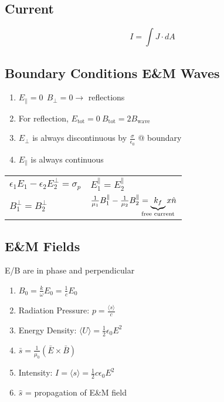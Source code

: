 \documentclass[10pt,letter]{article}
\begin{document}
\subsection{Current}
\begin{equation}
 I = \int J \cdot dA 
\end{equation}

\subsection{Boundary Conditions E\&M Waves}
\begin{enumerate}
    \item $E_\parallel = 0~~B_\perp = 0 \rightarrow$ reflections
    \item For reflection, $E_{\textrm{tot}} = 0~B_{\textrm{tot}} = 2B_{\textrm{wave}}$
    \item $E_\perp$ is always discontinuous by $\frac{\sigma}{\epsilon_0}$ @ boundary 
    \item $E_\parallel$ is always continuous
\end{enumerate}

\begin{tabular}{l l}
$\epsilon_1 E_1 - \epsilon_2 E_2^\perp = \sigma_p$ & $E_1^\parallel = E_2^\parallel$\\
$B_1^\perp = B_2^\perp$ & $\frac{1}{\mu_1} B_1^\parallel - \frac{1}{\mu_2}B_2^\parallel = \underbrace{k_f}_{\mathclap{\textrm{free current}}} x\hat{n}$
\end{tabular}

\subsection{E\&M Fields}
E/B are in phase and perpendicular

\begin{enumerate}
    \item $B_0 = \frac{k}{\omega}E_0 = \frac{1}{c}E_0$
    \item Radiation Pressure: $p =\frac{\langle s \rangle}{c}$
    \item Energy Density: $\langle U \rangle = \frac{1}{2}\epsilon_0 E^2$
    \item $\bar{s} = \frac{1}{\mu_0} ( \bar{E} \times \bar{B})$
    \item Intensity: $I = \langle s \rangle = \frac{1}{2} c \epsilon_0 E^2$
    \item $\hat{s}$ = propagation of E\&M field
\end{enumerate}
\end{document}
